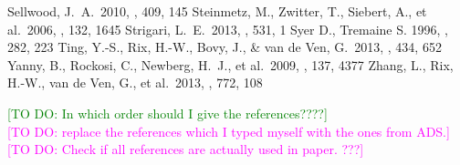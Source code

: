 \documentclass[iop,revtex4]{emulateapj}
\newcommand{\Wilma}[1]{\textcolor{Fuchsia}{#1}}
\newcommand{\HW}[1]{\textcolor{Green}{#1}}
\begin{document}
\begin{thebibliography}{}
 Sellwood, J.~A.\ 2010, \mnras, 409, 145 
 Steinmetz, M., Zwitter, T., Siebert, A., et al.\ 2006, \aj, 132, 1645 
 Strigari, L.~E.\ 2013, \physrep, 531, 1 
 Syer D., Tremaine S. 1996, \mnras, 282, 223
 Ting, Y.-S., Rix, H.-W., Bovy, J., \& van de Ven, G.\ 2013, \mnras, 434, 652
 Yanny, B., Rockosi, C., Newberg, H.~J., et al.\ 2009, \aj, 137, 4377 
 Zhang, L., Rix, H.-W., van de Ven, G., et al.\ 2013, \apj, 772, 108
\end{thebibliography}
\HW{[TO DO: In which order should I give the references????]}
\\\Wilma{[TO DO: replace the references which I typed myself with the ones from ADS.]}
\\\Wilma{[TO DO: Check if all references are actually used in paper. ???]}

\end{document}
